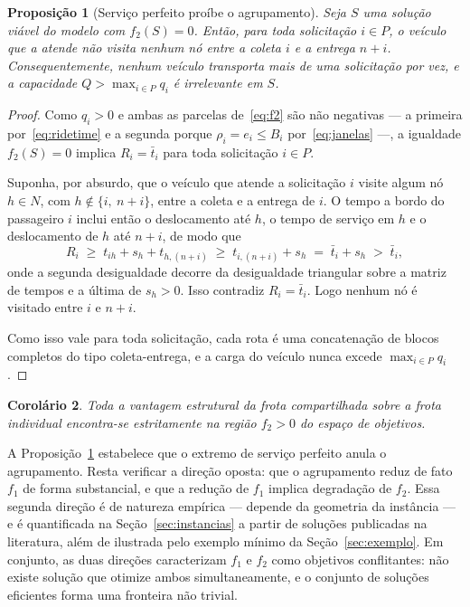 \documentclass[12pt,a4paper]{article}
\theoremstyle{plain}
\newtheorem{proposicao}{Proposição}
\newtheorem{corolario}[proposicao]{Corolário}
\begin{document}
\begin{proposicao}[Serviço perfeito proíbe o agrupamento]
\label{prop:conflito}
Seja $S$ uma solução viável do modelo com $f_2(S) = 0$. Então, para toda solicitação $i \in P$, o veículo que a atende não visita nenhum nó entre a coleta $i$ e a entrega $n+i$. Consequentemente, nenhum veículo transporta mais de uma solicitação por vez, e a capacidade $Q > \max_{i \in P} q_i$ é irrelevante em $S$.
\end{proposicao}

\begin{proof}
Como $q_i > 0$ e ambas as parcelas de~\eqref{eq:f2} são não negativas --- a primeira por~\eqref{eq:ridetime} e a segunda porque $\rho_i = e_i \leq B_i$ por~\eqref{eq:janelas} ---, a igualdade $f_2(S) = 0$ implica $R_i = \bar{t}_i$ para toda solicitação $i \in P$.

Suponha, por absurdo, que o veículo que atende a solicitação $i$ visite algum nó $h \in N$, com $h \notin \{i,\ n+i\}$, entre a coleta e a entrega de $i$. O tempo a bordo do passageiro $i$ inclui então o deslocamento até $h$, o tempo de serviço em $h$ e o deslocamento de $h$ até $n+i$, de modo que
\[
R_i \;\geq\; t_{ih} + s_h + t_{h,(n+i)} \;\geq\; t_{i,(n+i)} + s_h \;=\; \bar{t}_i + s_h \;>\; \bar{t}_i,
\]
onde a segunda desigualdade decorre da desigualdade triangular sobre a matriz de tempos e a última de $s_h > 0$. Isso contradiz $R_i = \bar{t}_i$. Logo nenhum nó é visitado entre $i$ e $n+i$.

Como isso vale para toda solicitação, cada rota é uma concatenação de blocos completos do tipo coleta-entrega, e a carga do veículo nunca excede $\max_{i \in P} q_i$.
\end{proof}

\begin{corolario}
Toda a vantagem estrutural da frota compartilhada sobre a frota individual encontra-se estritamente na região $f_2 > 0$ do espaço de objetivos.
\end{corolario}

A Proposição~\ref{prop:conflito} estabelece que o extremo de serviço perfeito anula o agrupamento. Resta verificar a direção oposta: que o agrupamento reduz de fato $f_1$ de forma substancial, e que a redução de $f_1$ implica degradação de $f_2$. Essa segunda direção é de natureza empírica --- depende da geometria da instância --- e é quantificada na Seção~\ref{sec:instancias} a partir de soluções publicadas na literatura, além de ilustrada pelo exemplo mínimo da Seção~\ref{sec:exemplo}. Em conjunto, as duas direções caracterizam $f_1$ e $f_2$ como objetivos conflitantes: não existe solução que otimize ambos simultaneamente, e o conjunto de soluções eficientes forma uma fronteira não trivial.
\end{document}
